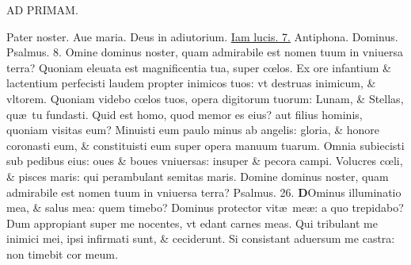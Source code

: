 \documentclass[a5paper,10pt]{book}
\def\ae{æ}
\def\oe{œ}
\begin{document}
\begin{multicols*}{2}
\begin{center}
AD PRIMAM.
\end{center}
\vspace{-1em}
\par \noindent \color{red} P\color{black}ater noster. Aue maria. Deus in adiutorium. \hyperlink{Iamlucis}{Iam lucis. 7.} \color{red} Antiphona. \color{black} Dominus. \color{red} Psalmus. \hypertarget{ps8}{8.} \color{black}
Omine dominus noster, quam admirabile est nomen tuum in vniuersa terra?
\newline \color{red} Q\color{black}uoniam eleuata est magnificentia tua, super c\oe los.
\newline \color{red} E\color{black}x ore infantium \& lactentium perfecisti laudem propter inimicos tuos: vt destruas inimicum, \& vltorem.
\newline \color{red} Q\color{black}uoniam videbo c\oe los tuos, opera digitorum tuorum: Lunam, \& Stellas, qu\ae \ tu fundasti.
\newline \color{red} Q\color{black}uid est homo, quod memor es eius? aut filius hominis, quoniam visitas eum?
\newline \color{red} M\color{black}inuisti eum paulo minus ab angelis: gloria, \& honore coronasti eum, \& constituisti eum super opera manuum tuarum.
\newline \color{red} O\color{black}mnia subiecisti sub pedibus eius: oues \& boues vniuersas: insuper \& pecora campi.
\newline \color{red} V\color{black}olucres c\oe li, \& pisces maris: qui perambulant semitas maris.
\newline \color{red} D\color{black}omine dominus noster, quam admirabile est nomen tuum in vniuersa terra? \quad \color{red} Psalmus. \hypertarget{ps26}{26.} \color{black}
\vspace{-1em}
\lettrine[lines=2]{\bfseries \color{red} D}{}Ominus illuminatio mea, \& salus mea: quem timebo?
\newline \color{red} D\color{black}ominus protector vit\ae \ me\ae : a quo trepidabo?
\newline \color{red} D\color{black}um appropiant super me nocentes, vt edant carnes meas.
\newline \color{red} Q\color{black}ui tribulant me inimici mei, ipsi infirmati sunt, \& ceciderunt.
\newline \color{red} S\color{black}i consistant aduersum me castra: non timebit cor meum.

\end{multicols*}
\end{document}
